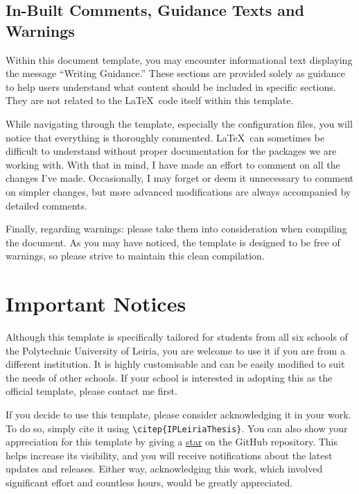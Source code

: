 {\subsection{In-Built Comments, Guidance Texts and Warnings}
Within this document template, you may encounter informational text displaying the message ``Writing Guidance.'' These sections are provided solely as guidance to help users understand what content should be included in specific sections. They are not related to the \LaTeX~code itself within this template.

While navigating through the template, especially the configuration files, you will notice that everything is thoroughly commented. \LaTeX~can sometimes be difficult to understand without proper documentation for the packages we are working with. With that in mind, I have made an effort to comment on all the changes I’ve made. Occasionally, I may forget or deem it unnecessary to comment on simpler changes, but more advanced modifications are always accompanied by detailed comments.

Finally, regarding warnings: please take them into consideration when compiling the document. As you may have noticed, the template is designed to be free of warnings, so please strive to maintain this clean compilation.

\section{Important Notices}
Although this template is specifically tailored for students from all six schools of the Polytechnic University of Leiria, you are welcome to use it if you are from a different institution. It is highly customisable and can be easily modified to suit the needs of other schools. If your school is interested in adopting this as the official template, please contact me first. 

If you decide to use this template, please consider acknowledging it in your work. To do so, simply cite it using \verb|\citep{IPLeiriaThesis}|. You can also show your appreciation for this template by giving a \href{https://github.com/joseareia/ipleiria-thesis/stargazers}{star} on the GitHub repository. This helps increase its visibility, and you will receive notifications about the latest updates and releases. Either way, acknowledging this work, which involved significant effort and countless hours, would be greatly appreciated.
}